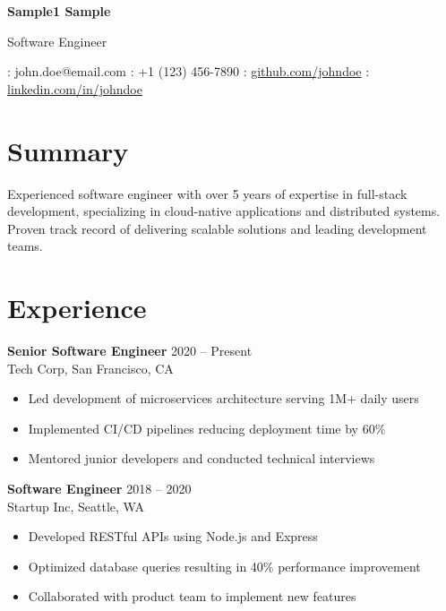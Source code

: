 \documentclass[11pt,a4paper]{article}
\newcommand{\contactItem}[2]{#1: #2\hspace{1cm}}
\begin{document}
\begin{center}
    {\Huge\textbf{Sample1 Sample}}

    \vspace{0.5em}
    {\large Software Engineer}

    \vspace{1em}
    \contactItem{\faEnvelope}{john.doe@email.com}
    \contactItem{\faPhone}{+1 (123) 456-7890}
    \contactItem{\faGithub}{\href{https://github.com/johndoe}{github.com/johndoe}}
    \contactItem{\faLinkedin}{\href{https://linkedin.com/in/johndoe}{linkedin.com/in/johndoe}}
\end{center}

\section{Summary}
Experienced software engineer with over 5 years of expertise in full-stack development,
specializing in cloud-native applications and distributed systems.
Proven track record of delivering scalable solutions and leading development teams.

\section{Experience}
\textbf{Senior Software Engineer} \hfill 2020 -- Present\\
Tech Corp, San Francisco, CA
\begin{itemize}[leftmargin=*]
    \item Led development of microservices architecture serving 1M+ daily users
    \item Implemented CI/CD pipelines reducing deployment time by 60\%
    \item Mentored junior developers and conducted technical interviews
\end{itemize}

\textbf{Software Engineer} \hfill 2018 -- 2020\\
Startup Inc, Seattle, WA
\begin{itemize}[leftmargin=*]
    \item Developed RESTful APIs using Node.js and Express
    \item Optimized database queries resulting in 40\% performance improvement
    \item Collaborated with product team to implement new features
\end{itemize}

\end{document}
